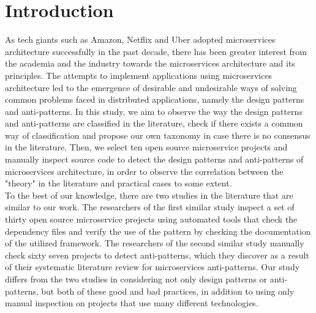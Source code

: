 \documentclass[11pt,a4paper,twocolumn]{article}
\begin{document}



\section{Introduction}
\label{sec:introduction}

As tech giants such as Amazon, Netflix and Uber adopted microservices architecture successfully in the past decade, there has been greater interest from the academia and the industry towards the microservices architecture and its principles.
The attempts to implement applications using microservices architecture led to the emergence of desirable and undesirable ways of solving common problems faced in distributed applications, namely the design patterns and anti-patterns.
In this study, we aim to observe the way the design patterns and anti-patterns are classified in the literature, check if there exists a common way of classification and propose our own taxonomy in case there is no consensus in the literature.
Then, we select ten open source microservice projects and manually inspect source code to detect the design patterns and anti-patterns of microservices architecture, in order to observe the correlation between the "theory" in the literature and practical cases to some extent.
\\
To the best of our knowledge, there are two studies in the literature that are similar to our work.
The researchers of the first similar study \cite{8719492} inspect a set of thirty open source microservice projects using automated tools that check the dependency files and verify the use of the pattern by checking the documentation of the utilized framework.
The researchers of the second similar study \cite{10.1145/3424771.3424812} manually check sixty seven projects to detect anti-patterns, which they discover as a result of their systematic literature review for microservices anti-patterns.
Our study differs from the two studies in considering not only design patterns or anti-patterns, but both of these good and bad practices, in addition to using only manual inspection on projects that use many different technologies.
\end{document}
